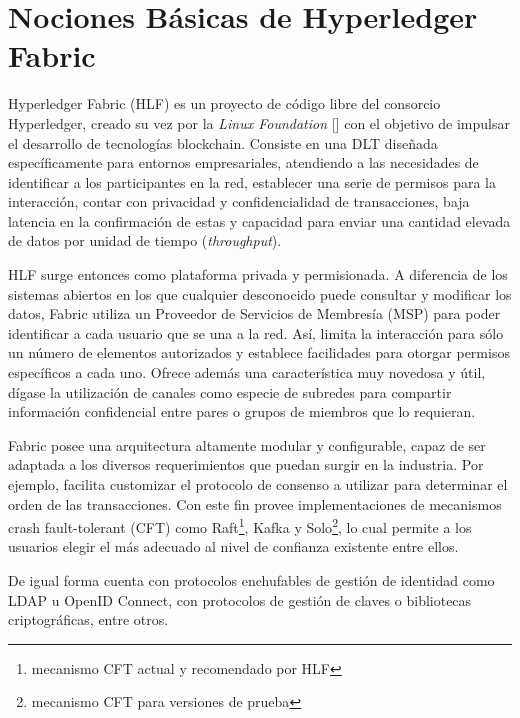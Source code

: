 
\section{Nociones B\'asicas de Hyperledger Fabric}

Hyperledger Fabric (HLF) es un proyecto de c\'odigo libre del consorcio Hyperledger, creado su vez por la \emph{Linux Foundation} [\cite{linuxfoundation}] con el objetivo de impulsar el desarrollo de tecnolog\'ias blockchain. Consiste en una DLT dise\~nada espec\'ificamente para entornos empresariales, atendiendo a las necesidades de identificar a los participantes en la red, establecer una serie de permisos para la interacci\'on, contar con privacidad y confidencialidad de transacciones, baja latencia en la confirmaci\'on de estas y capacidad para enviar una cantidad elevada de datos por unidad de tiempo (\emph{throughput}).

HLF surge entonces como plataforma privada y permisionada. A diferencia de los sistemas abiertos en los que cualquier desconocido puede consultar y modificar los datos, Fabric utiliza un Proveedor de Servicios de Membres\'ia (MSP) para poder identificar a cada usuario que se una a la red. As\'i, limita la interacci\'on para s\'olo un n\'umero de elementos autorizados y establece facilidades para otorgar permisos espec\'ificos a cada uno. Ofrece adem\'as una caracter\'istica muy novedosa y \'util, d\'igase la utilizaci\'on de canales como especie de subredes para compartir informaci\'on confidencial entre pares o grupos de miembros que lo requieran.

Fabric posee una arquitectura altamente modular y configurable, capaz de ser adaptada a los diversos requerimientos que puedan surgir en la industria. Por ejemplo, facilita customizar el protocolo de consenso a utilizar para determinar el orden de las transacciones. Con este fin provee implementaciones de mecanismos crash fault-tolerant (CFT) como Raft\footnote{mecanismo CFT actual y recomendado por HLF}, Kafka y Solo\footnote{mecanismo CFT para versiones de prueba}, lo cual permite a los usuarios elegir el m\'as adecuado al nivel de confianza existente entre ellos.

De igual forma cuenta con protocolos enchufables de gesti\'on de identidad como LDAP u OpenID Connect, con protocolos de gesti\'on de claves o bibliotecas criptogr\'aficas, entre otros.

